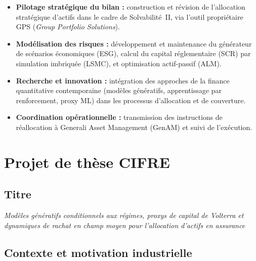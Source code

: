 \documentclass[10pt,a4paper]{article}
\begin{document}
\begin{itemize}[leftmargin=1.6em,itemsep=1pt]
  \item \textbf{Pilotage stratégique du bilan :} construction et révision de
        l'allocation stratégique d'actifs dans le cadre de Solvabilité~II, via
        l'outil propriétaire GPS (\textit{Group Portfolio Solutions}).
  \item \textbf{Modélisation des risques :} développement et maintenance du
        générateur de scénarios économiques (ESG), calcul du capital réglementaire
        (SCR) par simulation imbriquée (LSMC), et optimisation actif-passif (ALM).
  \item \textbf{Recherche et innovation :} intégration des approches de la
        finance quantitative contemporaine (modèles génératifs, apprentissage par
        renforcement, proxy ML) dans les processus d'allocation et de couverture.
  \item \textbf{Coordination opérationnelle :} transmission des instructions de
        réallocation à Generali Asset Management (GenAM) et suivi de l'exécution.
\end{itemize}

\section{Projet de thèse CIFRE}

\subsection{Titre}

\begin{center}
  \itshape
  Modèles génératifs conditionnels aux régimes, proxys de capital de Volterra
  et dynamiques de rachat en champ moyen pour l'allocation d'actifs en assurance
\end{center}

\subsection{Contexte et motivation industrielle}
\end{document}

